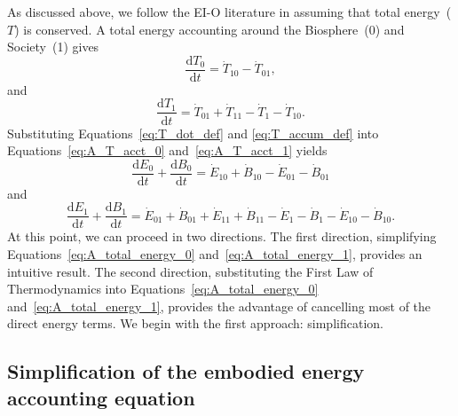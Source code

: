 As discussed above, we follow the EI-O literature in assuming that 
total energy~($T$) is conserved. 
A total energy accounting around the Biosphere~(0)
and Society~(1) gives
%
\begin{equation} \label{eq:A_T_acct_0}
	\frac{\mathrm{d}T_{0}}{\mathrm{d}t} 
	= \dot{T}_{10} 
	- \dot{T}_{01},
\end{equation}
%
and
%
\begin{equation} \label{eq:A_T_acct_1}
	\frac{\mathrm{d}T_{1}}{\mathrm{d}t} 
	= \dot{T}_{01} 
	+ \dot{T}_{11}
	- \dot{T}_{1}
	- \dot{T}_{10}.
\end{equation}
%
Substituting Equations~\ref{eq:T_dot_def} and
\ref{eq:T_accum_def} into 
Equations~\ref{eq:A_T_acct_0} and~\ref{eq:A_T_acct_1}
yields
%
\begin{equation} \label{eq:A_total_energy_0}
	\frac{\mathrm{d}E_{0}}{\mathrm{d}t} 
	+ \frac{\mathrm{d}B_{0}}{\mathrm{d}t} 
	= \dot{E}_{10} 
	+ \dot{B}_{10} 
	- \dot{E}_{01}
	- \dot{B}_{01}
\end{equation}
%
and
%
\begin{equation} \label{eq:A_total_energy_1}
	\frac{\mathrm{d}E_{1}}{\mathrm{d}t} 
	+ \frac{\mathrm{d}B_{1}}{\mathrm{d}t} 
	= \dot{E}_{01} 
	+ \dot{B}_{01} 
	+ \dot{E}_{11}
	+ \dot{B}_{11}
	- \dot{E}_{1}
	- \dot{B}_{1}
	- \dot{E}_{10}
	- \dot{B}_{10}.	
\end{equation}
%
At this point, we can proceed in two directions.
The first direction, 
simplifying Equations~\ref{eq:A_total_energy_0} 
and~\ref{eq:A_total_energy_1}, 
provides an intuitive result. 
The second direction,
substituting the First Law of Thermodynamics
into 
Equations~\ref{eq:A_total_energy_0} 
and~\ref{eq:A_total_energy_1}, 
provides the advantage of cancelling most of the direct energy terms.
We begin with the first approach: simplification.


\subsection{Simplification of the embodied energy accounting equation} %
\label{sec:A_simplified_embodied}

